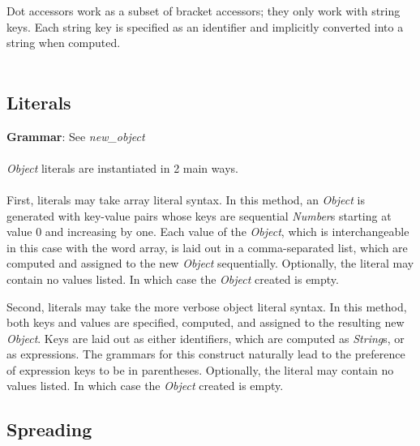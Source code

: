 \documentclass[12pt,letterpaper]{report}
\begin{document}
Dot accessors work as a subset of bracket accessors; they only work with string keys. 
Each string key is specified as an identifier and implicitly converted into a string when computed.
\\\\


\subsection{Literals}\label{Literals}

\textbf{Grammar}: See \textit{new\_object}
\\\\
\textit{Object} literals are instantiated in 2 main ways.
\\\\
First, literals may take array literal syntax. In this method, an \textit{Object} is generated with 
key-value pairs whose keys are sequential \textit{Number}s starting at value 0 and increasing by one.
Each value of the \textit{Object}, which is interchangeable in this case with the word array,
is laid out in a comma-separated list, which are computed and assigned to the new \textit{Object} sequentially.
Optionally, the literal may contain no values listed. In which case the \textit{Object} created is empty.



Second, literals may take the more verbose object literal syntax. In this method, both 
keys and values are specified, computed, and assigned to the resulting new \textit{Object}.
Keys are laid out as either identifiers, which are computed as \textit{String}s, or 
as expressions. The grammars for this construct naturally lead to the preference of 
expression keys to be in parentheses.
Optionally, the literal may contain no values listed. In which case the \textit{Object} created is empty.




\subsection{Spreading}\label{Spreading}
\end{document}
